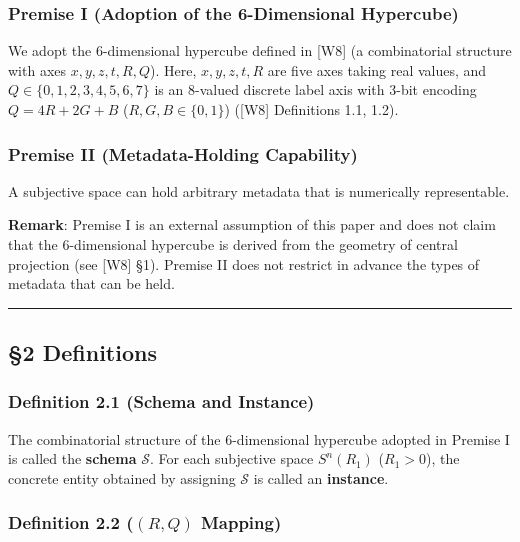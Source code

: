 \documentclass[
  a4paper,11pt]{article}
\theoremstyle{definition}
\theoremstyle{remark}
\begin{document}
\subsubsection{Premise I (Adoption of the 6-Dimensional
Hypercube)}\label{premise-i-adoption-of-the-6-dimensional-hypercube}

We adopt the 6-dimensional hypercube defined in {[}W8{]} (a
combinatorial structure with axes \(x, y, z, t, R, Q\)). Here,
\(x, y, z, t, R\) are five axes taking real values, and
\(Q \in \{0, 1, 2, 3, 4, 5, 6, 7\}\) is an 8-valued discrete label axis
with 3-bit encoding \(Q = 4R + 2G + B\) (\(R, G, B \in \{0, 1\}\))
({[}W8{]} Definitions 1.1, 1.2).

\subsubsection{Premise II (Metadata-Holding
Capability)}\label{premise-ii-metadata-holding-capability}

A subjective space can hold arbitrary metadata that is numerically
representable.

\textbf{Remark}: Premise I is an external assumption of this paper and
does not claim that the 6-dimensional hypercube is derived from the
geometry of central projection (see {[}W8{]} §1). Premise II does not
restrict in advance the types of metadata that can be held.

\begin{center}\rule{0.5\linewidth}{0.5pt}\end{center}

\subsection{§2 Definitions}\label{definitions}

\subsubsection{Definition 2.1 (Schema and
Instance)}\label{definition-2.1-schema-and-instance}

The combinatorial structure of the 6-dimensional hypercube adopted in
Premise I is called the \textbf{schema} \(\mathcal{S}\). For each
subjective space \(S^n(R_1)\) (\(R_1 > 0\)), the concrete entity
obtained by assigning \(\mathcal{S}\) is called an \textbf{instance}.

\subsubsection{\texorpdfstring{Definition 2.2 (\((R, Q)\)
Mapping)}{Definition 2.2 ((R, Q) Mapping)}}\label{definition-2.2-r-q-mapping}
\end{document}

